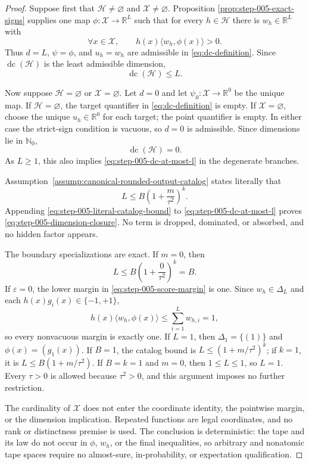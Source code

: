\begin{proof}
Suppose first that \(\mathcal H\ne\varnothing\) and
\(\mathcal X\ne\varnothing\).  Proposition
\ref{prop:step-005-exact-signs} supplies one map
\(\phi:\mathcal X\to\mathbb R^L\) such that for every
\(h\in\mathcal H\) there is \(w_h\in\mathbb R^L\) with
\[
\forall x\in\mathcal X,
\qquad
h(x)\langle w_h,\phi(x)\rangle>0.
\]
Thus \(d=L\), \(\psi=\phi\), and \(u_h=w_h\) are admissible in
\eqref{eq:dc-definition}.  Since \(\operatorname{dc}(\mathcal H)\) is the
least admissible dimension,
\begin{equation}
\operatorname{dc}(\mathcal H)\le L.
\label{eq:step-005-dc-at-most-l}
\end{equation}

Now suppose \(\mathcal H=\varnothing\) or \(\mathcal X=\varnothing\).  Let
\(d=0\) and let \(\psi_0:\mathcal X\to\mathbb R^0\) be the unique map.  If
\(\mathcal H=\varnothing\), the target quantifier in
\eqref{eq:dc-definition} is empty.  If \(\mathcal X=\varnothing\), choose
the unique \(u_h\in\mathbb R^0\) for each target; the point quantifier is
empty.  In either case the strict-sign condition is vacuous, so \(d=0\) is
admissible.  Since dimensions lie in \(\mathbb N_0\),
\begin{equation}
\operatorname{dc}(\mathcal H)=0.
\label{eq:step-005-empty-dimension}
\end{equation}
As \(L\ge1\), this also implies \eqref{eq:step-005-dc-at-most-l} in the
degenerate branches.

Assumption~\ref{assump:canonical-rounded-output-catalog} states literally
that
\begin{equation}
L\le B\left(1+\frac{m}{\tau^2}\right)^k.
\label{eq:step-005-literal-catalog-bound}
\end{equation}
Appending \eqref{eq:step-005-literal-catalog-bound} to
\eqref{eq:step-005-dc-at-most-l} proves
\eqref{eq:step-005-dimension-closure}.  No term is dropped, dominated, or
absorbed, and no hidden factor appears.

The boundary specializations are exact.  If \(m=0\), then
\[
L\le B\left(1+\frac{0}{\tau^2}\right)^k=B.
\]
If \(\varepsilon=0\), the lower margin in
\eqref{eq:step-005-score-margin} is one.  Since \(w_h\in\Delta_L\) and each
\(h(x)g_i(x)\in\{-1,+1\}\),
\[
h(x)\langle w_h,\phi(x)\rangle
\le\sum_{i=1}^Lw_{h,i}=1,
\]
so every nonvacuous margin is exactly one.  If \(L=1\), then
\(\Delta_1=\{(1)\}\) and \(\phi(x)=(g_1(x))\).  If \(B=1\), the catalog
bound is \(L\le(1+m/\tau^2)^k\); if \(k=1\), it is
\(L\le B(1+m/\tau^2)\).  If \(B=k=1\) and \(m=0\), then
\(1\le L\le1\), so \(L=1\).  Every \(\tau>0\) is allowed because
\(\tau^2>0\), and this argument imposes no further restriction.

The cardinality of \(\mathcal X\) does not enter the coordinate identity,
the pointwise margin, or the dimension implication.  Repeated functions are
legal coordinates, and no rank or distinctness premise is used.  The
conclusion is deterministic: the tape and its law do not occur in \(\phi\),
\(w_h\), or the final inequalities, so arbitrary and nonatomic tape spaces
require no almost-sure, in-probability, or expectation qualification.
\end{proof}

